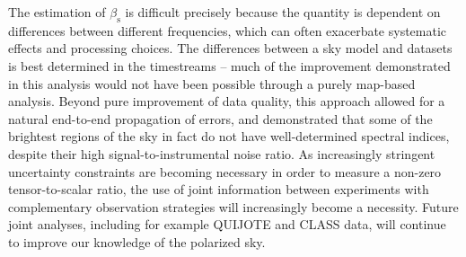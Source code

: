 \documentclass[twocolumn]{../../common/aa}
\def\WMAPnine{\emph{WMAP9}}
\def\Planck{\emph{Planck}}
\newcommand{\cosmoglobe}{\textsc{Cosmoglobe}}
\newcommand{\Cosmoglobe}{\textsc{Cosmoglobe}}
\newcommand{\K}[0]{\textit K}
\begin{document}
The estimation of $\beta_\mathrm s$ is difficult precisely because the quantity is dependent on differences between different frequencies, which can often exacerbate systematic effects and processing choices. The differences between a sky model and datasets is best determined in the timestreams -- much of the improvement demonstrated in this analysis would not have been possible through a purely map-based analysis. Beyond pure improvement of data quality, this approach allowed for a natural end-to-end propagation of errors, and demonstrated that some of the brightest regions of the sky in fact do not have well-determined spectral indices, despite their high signal-to-instrumental noise ratio. As increasingly stringent uncertainty constraints are becoming necessary in order to measure a non-zero tensor-to-scalar ratio, the use of joint information between experiments with complementary observation strategies will increasingly become a necessity. Future joint analyses, including for example QUIJOTE and CLASS data, will continue to improve our knowledge of the polarized sky.














\end{document}
